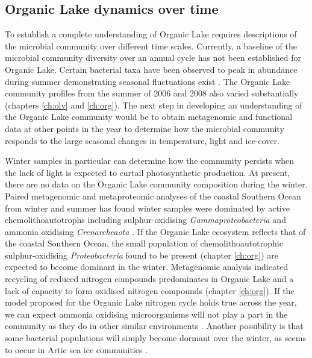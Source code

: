 \subsection{Organic Lake dynamics over time}
To establish a complete understanding of Organic Lake requires descriptions of the microbial community over different time scales.
Currently, a baseline of the microbial community diversity over an annual cycle has not been established for Organic Lake.
Certain bacterial taxa have been observed to peak in abundance during summer demonstrating seasonal fluctuations exist \cite{James1994}.
The Organic Lake community profiles from the summer of 2006 and 2008 also varied substantially (chapters \ref{ch:olv} and \ref{ch:org}).
The next step in developing an understanding of the Organic Lake community would be to obtain metagenomic and functional data at other points in the year to determine how the microbial community responds to the large seasonal changes in temperature, light and ice-cover.

Winter samples in particular can determine how the community persists when the lack of light is expected to curtail photosynthetic production.
At present, there are no data on the Organic Lake community composition during the winter.
Paired metagenomic and metaproteomic analyses of the coastal Southern Ocean from winter and summer has found winter samples were dominated by active chemolithoautotrophs including sulphur-oxidising \emph{Gammaproteobacteria} and ammonia oxidising \emph{Crenarcheaota} \cite{Grzymski2012, Williams2012b}.
If the Organic Lake ecosystem reflects that of the coastal Southern Ocean, the small population of chemolithoautotrophic sulphur-oxidising \emph{Proteobacteria} found to be present (chapter \ref{ch:org}) are expected to become dominant in the winter.
Metagenomic analysis indicated recycling of reduced nitrogen compounds predominates in Organic Lake and a lack of capacity to form oxidised nitrogen compounds (chapter \ref{ch:org}).
If the model proposed for the Organic Lake nitrogen cycle holds true across the year, we can expect ammonia oxidising microorganisms will not play a part in the community as they do in other similar environments \cite{Voytek1999, Grzymski2012, Williams2012b}.
Another possibility is that some bacterial populations will simply become dormant over the winter, as seems to occur in Artic sea ice communities \cite{Collins2010}.


